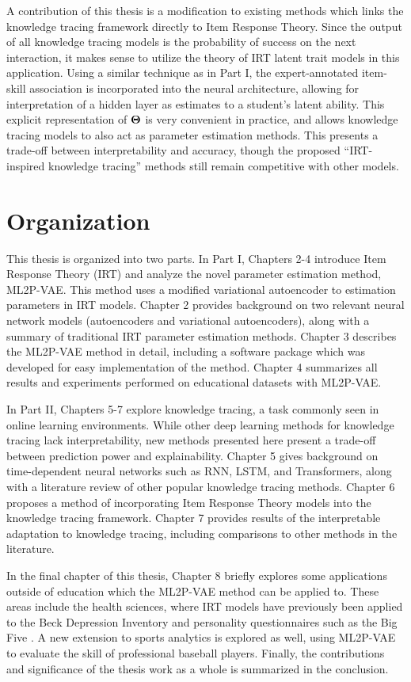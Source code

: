 A contribution of this thesis is a modification to existing methods which links the knowledge tracing framework directly to Item Response Theory. Since the output of all knowledge tracing models is the probability of success on the next interaction, it makes sense to utilize the theory of IRT latent trait models in this application. Using a similar technique as in Part I, the expert-annotated item-skill association is incorporated into the neural architecture, allowing for interpretation of a hidden layer as estimates to a student's latent ability. This explicit representation of $\boldsymbol{\Theta}$ is very convenient in practice, and allows knowledge tracing models to also act as parameter estimation methods. This presents a trade-off between interpretability and accuracy, though the proposed ``IRT-inspired knowledge tracing'' methods still remain competitive with other models.

\section{Organization}
This thesis is organized into two parts. In Part I, Chapters 2-4 introduce Item Response Theory (IRT) and analyze the novel parameter estimation method, ML2P-VAE. This method uses a modified variational autoencoder to estimation parameters in IRT models. Chapter 2 provides background on two relevant neural network models (autoencoders and variational autoencoders), along with a summary of traditional IRT parameter estimation methods. Chapter 3 describes the ML2P-VAE method in detail, including a software package which was developed for easy implementation of the method. Chapter 4 summarizes all results and experiments performed on educational datasets with ML2P-VAE.

In Part II, Chapters 5-7 explore knowledge tracing, a task commonly seen in online learning environments. While other deep learning methods for knowledge tracing lack interpretability, new methods presented here present a trade-off between prediction power and explainability. Chapter 5 gives background on time-dependent neural networks such as RNN, LSTM, and Transformers, along with a literature review of other popular knowledge tracing methods. Chapter 6 proposes a method of incorporating Item Response Theory models into the knowledge tracing framework. Chapter 7 provides results of the interpretable adaptation to knowledge tracing, including comparisons to other methods in the literature.

In the final chapter of this thesis, Chapter 8 briefly explores some applications outside of education which the ML2P-VAE method can be applied to. These areas include the health sciences, where IRT models have previously been applied to the Beck Depression Inventory \cite{beck1996, huang2015, fragoso2013} and personality questionnaires such as the Big Five \cite{robie2001}. A new extension to sports analytics is explored as well, using ML2P-VAE to evaluate the skill of professional baseball players. Finally, the contributions and significance of the thesis work as a whole is summarized in the conclusion.

